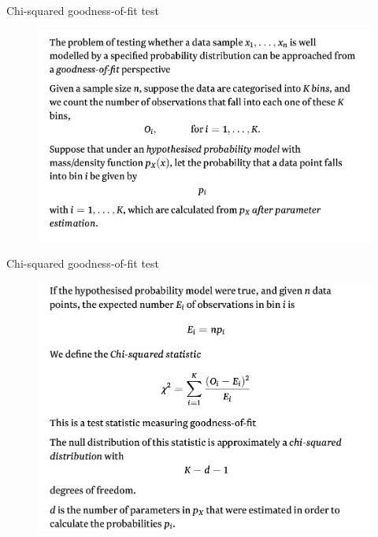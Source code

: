 \documentclass{beamer}
\begin{document}
\begin{frame}{Chi-squared goodness-of-fit test}
	\begin{figure}
                \includegraphics[width=0.85\linewidth]{gof1.png}
        \end{figure}	
\end{frame}

\begin{frame}{Chi-squared goodness-of-fit test}
        \begin{figure}
                \includegraphics[width=0.85\linewidth]{gof2.png}
        \end{figure}
\end{frame}
\end{document}
